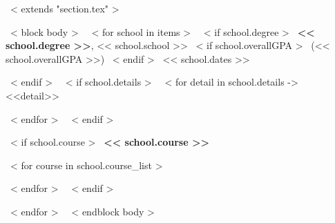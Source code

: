 ~< extends "section.tex" >~

~< block body >~
~< for school in items >~
  ~< if school.degree >~
    \textbf{<< school.degree >>}, << school.school >>
    ~< if school.overallGPA >~
        (<< school.overallGPA >>)
    ~< endif >~
    \hfill << school.dates >> \par
  ~< endif >~
  ~< if school.details >~
    ~< for detail in school.details ->~
        <<detail>> \par
    ~< endfor >~
  ~< endif >~



  ~< if school.course >~
    \textbf{<< school.course >>}
    
    ~< for course in school.course_list >~
      {\scriptsize \color{gray}{<< course >>} \par}
    ~< endfor >~
  ~< endif >~

  \vspace{3mm}
~< endfor >~
\vspace{-3mm}
~< endblock body >~



